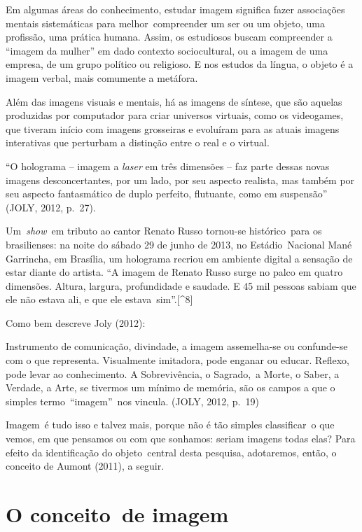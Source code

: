 \documentclass[
  letterpaper,
  a4paper,
  12pt]{scrbook}
\renewenvironment{quote}
  {\par\singlespacing\small\list{}{\rightmargin=0cm \leftmargin=4cm}%
   \item\relax}
  {\endlist}
\begin{document}
Em algumas áreas do conhecimento, estudar imagem significa fazer
associações mentais sistemáticas para melhor~compreender um ser ou um
objeto, uma profissão, uma prática humana. Assim, os estudiosos buscam
compreender a ``imagem da mulher'' em dado contexto sociocultural, ou a
imagem de uma empresa, de um grupo político ou religioso. E nos estudos
da língua, o objeto é a imagem verbal, mais comumente a metáfora.~

Além das imagens visuais e mentais, há as imagens de síntese, que são
aquelas produzidas por computador para criar universos virtuais, como os
videogames, que tiveram início com imagens grosseiras e evoluíram para
as atuais imagens interativas que perturbam a distinção entre o real e o
virtual.

\begin{quote}
``O holograma -- imagem a \emph{laser} em três dimensões -- faz parte
dessas novas imagens desconcertantes, por um lado, por seu aspecto
realista, mas também por seu aspecto fantasmático de duplo perfeito,
flutuante, como em suspensão'' (JOLY, 2012, p.~27).
\end{quote}

Um~\emph{show}~em tributo ao cantor Renato Russo tornou-se
histórico~para os brasilienses: na noite do sábado 29 de junho de 2013,
no Estádio~Nacional Mané Garrincha, em Brasília, um holograma recriou em
ambiente digital a sensação de estar diante do artista. ``A imagem de
Renato Russo surge no palco em quatro dimensões. Altura, largura,
profundidade e saudade. E 45 mil pessoas sabiam que ele não estava ali,
e que ele estava~sim''.{[}\^{}8{]}

Como bem descreve Joly (2012):~

\begin{quote}
Instrumento de comunicação, divindade, a imagem assemelha-se ou
confunde-se com o que representa. Visualmente imitadora, pode enganar ou
educar. Reflexo, pode levar ao conhecimento. A Sobrevivência, o
Sagrado,~a Morte, o Saber, a Verdade, a Arte, se tivermos um mínimo de
memória, são os campos a que o simples termo~``imagem''~nos vincula.
(JOLY, 2012, p.~19)~ ~
\end{quote}

Imagem~é tudo isso e talvez mais, porque não é tão simples classificar~o
que vemos, em que pensamos ou com que sonhamos: seriam imagens todas
elas? Para efeito da identificação do objeto~central desta pesquisa,
adotaremos, então, o conceito de Aumont (2011), a seguir. ~

\hypertarget{o-conceito-de-imagem}{%
\section{O conceito~de imagem}\label{o-conceito-de-imagem}}
\end{document}
